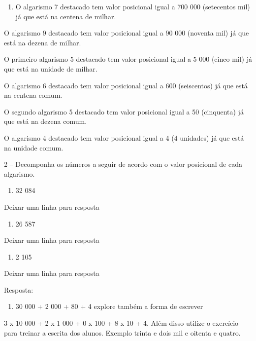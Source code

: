 \begin{enumerate}
\def\labelenumi{\alph{enumi})}
\item
  O algarismo 7 destacado tem valor posicional igual a 700 000
  (setecentos mil) já que está na centena de milhar.
\end{enumerate}

O algarismo 9 destacado tem valor posicional igual a 90 000 (noventa
mil) já que está na dezena de milhar.

O primeiro algarismo 5 destacado tem valor posicional igual a 5 000
(cinco mil) já que está na unidade de milhar.

O algarismo 6 destacado tem valor posicional igual a 600 (seiscentos) já
que está na centena comum.

O segundo algarismo 5 destacado tem valor posicional igual a 50
(cinquenta) já que está na dezena comum.

O algarismo 4 destacado tem valor posicional igual a 4 (4 unidades) já
que está na unidade comum.

2 -- Decomponha os números a seguir de acordo com o valor posicional de
cada algarismo.

\begin{enumerate}
\def\labelenumi{\alph{enumi})}
\item
  32 084
\end{enumerate}

Deixar uma linha para resposta

\begin{enumerate}
\def\labelenumi{\alph{enumi})}
\item
  26 587
\end{enumerate}

Deixar uma linha para resposta

\begin{enumerate}
\def\labelenumi{\alph{enumi})}
\item
  2 105
\end{enumerate}

Deixar uma linha para resposta

Resposta:

\begin{enumerate}
\def\labelenumi{\alph{enumi})}
\item
  30 000 + 2 000 + 80 + 4 explore também a forma de escrever
\end{enumerate}

3 x 10 000 + 2 x 1 000 + 0 x 100 + 8 x 10 + 4. Além disso utilize o
exercício para treinar a escrita dos alunos. Exemplo trinta e dois mil e
oitenta e quatro.

